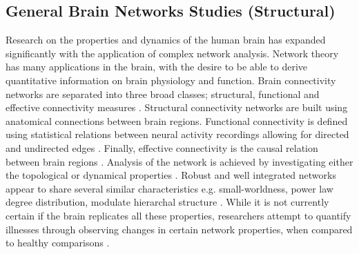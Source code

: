 \documentclass[11pt]{article}
\begin{document}
\subsection{General Brain Networks Studies (Structural)}
Research on the properties and dynamics of the human brain has expanded significantly with the application of complex network analysis. Network theory has many applications in the brain, with the desire to be able to derive quantitative information on brain physiology and function. Brain connectivity networks are separated into three broad classes; structural, functional and effective connectivity measures \citep{fornito2013graph}. Structural connectivity networks are built using anatomical connections between brain regions. Functional connectivity is defined using statistical relations between neural activity recordings allowing for directed and undirected edges \citep{friston}. Finally, effective connectivity is the causal relation between brain regions \citep{fornito2013graph}. Analysis of the network is achieved by investigating either the topological or dynamical properties \citep{revbull}. Robust and well integrated networks appear to share several similar characteristics e.g. small-worldness, power law degree distribution, modulate hierarchal structure \citep{albert2002statistical}. While it is not currently certain if the brain replicates all these properties, researchers attempt to quantify illnesses through observing changes in certain network properties, when compared to healthy comparisons \citep{revbull}. \\
\\
\end{document}
